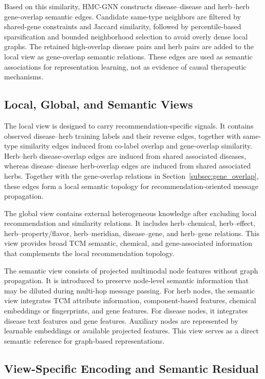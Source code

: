 \documentclass[journal,twoside,web]{ieeecolor}
\begin{document}
Based on this similarity, HMC-GNN constructs disease--disease and herb--herb gene-overlap semantic edges. Candidate same-type neighbors are filtered by shared-gene constraints and Jaccard similarity, followed by percentile-based sparsification and bounded neighborhood selection to avoid overly dense local graphs. The retained high-overlap disease pairs and herb pairs are added to the local view as gene-overlap semantic relations. These edges are used as semantic associations for representation learning, not as evidence of causal therapeutic mechanisms.

\subsection{Local, Global, and Semantic Views}
\label{subsec:views}

The local view is designed to carry recommendation-specific signals. It contains observed disease--herb training labels and their reverse edges, together with same-type similarity edges induced from co-label overlap and gene-overlap similarity. Herb--herb disease-overlap edges are induced from shared associated diseases, whereas disease--disease herb-overlap edges are induced from shared associated herbs. Together with the gene-overlap relations in Section~\ref{subsec:gene_overlap}, these edges form a local semantic topology for recommendation-oriented message propagation.

The global view contains external heterogeneous knowledge after excluding local recommendation and similarity relations. It includes herb--chemical, herb--effect, herb--property/flavor, herb--meridian, disease--gene, and herb--gene relations. This view provides broad TCM semantic, chemical, and gene-associated information that complements the local recommendation topology.

The semantic view consists of projected multimodal node features without graph propagation. It is introduced to preserve node-level semantic information that may be diluted during multi-hop message passing. For herb nodes, the semantic view integrates TCM attribute information, component-based features, chemical embeddings or fingerprints, and gene features. For disease nodes, it integrates disease text features and gene features. Auxiliary nodes are represented by learnable embeddings or available projected features. This view serves as a direct semantic reference for graph-based representations.

\subsection{View-Specific Encoding and Semantic Residual}
\label{subsec:encoding}
\end{document}
